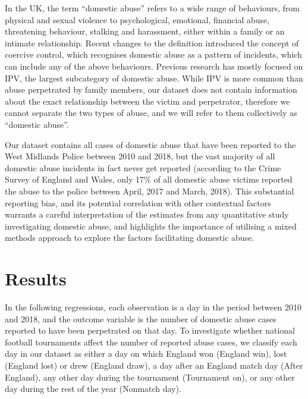\documentclass[12pt, letterpaper]{article}
\begin{document}
In the UK, the term ``domestic abuse'' refers to a wide range of behaviours, from physical and sexual violence to psychological, emotional, financial abuse, threatening behaviour, stalking and harassment, either within a family or an intimate relationship\autocite{ONS}. Recent changes to the definition introduced the concept of coercive control, which recognises domestic abuse as a pattern of incidents, which can include any of the above behaviours. Previous research has mostly focused on IPV, the largest subcategory of domestic abuse. While IPV is more common than abuse perpetrated by family members\autocite{ONS}, our dataset does not contain information about the exact relationship between the victim and perpetrator, therefore we cannot separate the two types of abuse, and we will refer to them collectively as ``domestic abuse''.


Our dataset contains all cases of domestic abuse that have been reported to the West Midlands Police between 2010 and 2018, but the vast majority of all domestic abuse incidents in fact never get reported (according to the Crime Survey of England and Wales, only 17\% of all domestic abuse victims reported the abuse to the police between April, 2017 and March, 2018\autocite{ONS}). This substantial reporting bias, and its potential correlation with other contextual factors warrants a careful interpretation of the estimates from any quantitative study investigating domestic abuse, and highlights the importance of utilising a mixed methods approach to explore the factors facilitating domestic abuse. 


\newpage



\section{Results}

In the following regressions, each observation is a day in the period between 2010 and 2018, and the outcome variable is the number of domestic abuse cases reported to have been perpetrated on that day. To investigate whether national football tournaments affect the number of reported abuse cases, we classify each day in our dataset as either a day on which England won (England win), lost (England lost) or drew (England draw), a day after an England match day (After England), any other day during the tournament (Tournament on), or any other day during the rest of the year (Nonmatch day). 
\end{document}
